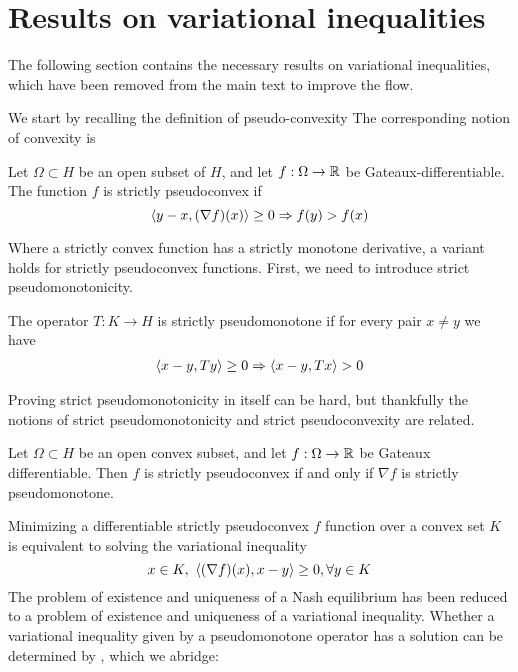 \section{Results on variational inequalities}
\label{sec:appendix}
The following section contains the necessary results on variational inequalities, which have been removed from the main text to improve the flow.

We start by recalling the definition of pseudo-convexity
The corresponding notion of convexity is
\begin{definition}
  Let $\Omega \subset H$ be an open subset of $H$, and let $f:\Omega \to \mathbb{R}$ be Gateaux-differentiable. The function $f$ is strictly pseudoconvex if
  \begin{equation}
    \left \langle y-x,(\nabla f)(x) \right \rangle \geq 0 \Rightarrow f(y) > f(x)
  \end{equation}
\end{definition}
Where a strictly convex function has a strictly monotone derivative, a variant holds for strictly pseudoconvex functions. First, we need to introduce strict pseudomonotonicity.
\begin{definition}
 The operator $T: K \to H$ is strictly pseudomonotone if for every pair $x\neq y$ we have
 \begin{align}
   \left \langle x-y,Ty \right \rangle \geq 0 \Rightarrow \left \langle x-y,Tx \right \rangle > 0
 \end{align}
\end{definition}
Proving strict pseudomonotonicity in itself can be hard, but thankfully the notions of strict pseudomonotonicity and strict pseudoconvexity are related.
\begin{theorem}
  Let $\Omega \subset H$ be an open convex subset, and let $f:\Omega \to \mathbb{R}$ be Gateaux differentiable. Then $f$ is strictly pseudoconvex if and only if $\nabla f$ is strictly pseudomonotone.
\end{theorem}
Minimizing a differentiable strictly pseudoconvex $f$ function over a convex set $K$ is equivalent to solving the variational inequality
\begin{equation}
  x \in K, ~ \left \langle (\nabla f)(x),x-y \right \rangle \geq 0, \forall y\in K
\end{equation}
The problem of existence and uniqueness of a Nash equilibrium has been reduced to a problem of existence and uniqueness of a variational inequality. Whether a variational inequality given by a pseudomonotone operator has a solution can be determined by \citep[Theorem 3.4]{maugeri2009existence}, which we abridge:

